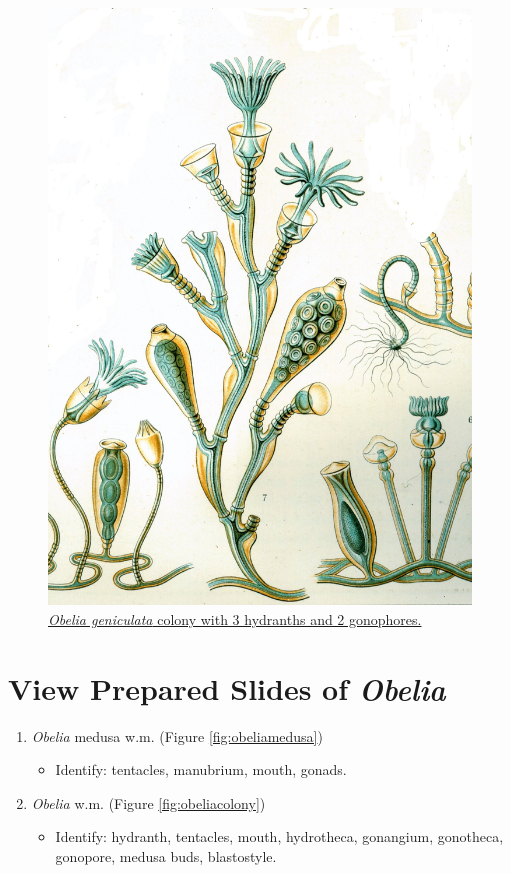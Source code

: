 \begin{figure}

{\centering \includegraphics[width=0.7\linewidth]{./figures/porifera/obelia_geniculata}

}

\caption{\href{https://commons.wikimedia.org/wiki/File:Obelia_geniculata.jpg}{\emph{Obelia
geniculata} colony with 3 hydranths and 2 gonophores.}}\label{fig:obelia}
\end{figure}

\section{View Prepared Slides of
\emph{Obelia}}\label{view-prepared-slides-of-obelia}

\begin{enumerate}
\def\labelenumi{\arabic{enumi}.}
\tightlist
\item
  \emph{Obelia} medusa w.m. (Figure \ref{fig:obeliamedusa})

  \begin{itemize}
  \tightlist
  \item
    Identify: tentacles, manubrium, mouth, gonads.
  \end{itemize}
\item
  \emph{Obelia} w.m. (Figure \ref{fig:obeliacolony})

  \begin{itemize}
  \tightlist
  \item
    Identify: hydranth, tentacles, mouth, hydrotheca, gonangium,
    gonotheca, gonopore, medusa buds, blastostyle.
  \end{itemize}
\end{enumerate}




